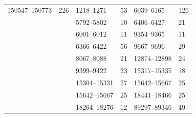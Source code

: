 \begin{table}[ht]
\begin{tabular}{ll|ll|ll}
	150547--150773                                   & 226                                           & 1218--1271                                   & 53                                         & 6039--6165                                   & 126                                       \\
													 &                                               & 5792--5802                                   & 10                                         & 6406--6427                                   & 21                                        \\
													 &                                               & 6001--6012                                   & 11                                         & 9354--9365                                   & 11                                        \\
													 &                                               & 6366--6422                                   & 56                                         & 9667--9696                                   & 29                                        \\
													 &                                               & 8067--8088                                   & 21                                         & 12874--12898                                 & 24                                        \\
													 &                                               & 9399--9422                                   & 23                                         & 15317--15335                                 & 18                                        \\
													 &                                               & 15304--15331                                 & 27                                         & 15642--15667                                 & 25                                        \\
													 &                                               & 15642--15667                                 & 25                                         & 18441--18466                                 & 25                                        \\
													 &                                               & 18264--18276                                 & 12                                         & 89297--89346                                 & 49                                        \\

\end{tabular}
\end{table}
